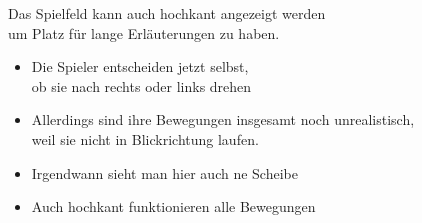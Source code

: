 \documentclass[preview]{standalone}
\begin{document}
\begin{center}
Das Spielfeld kann auch hochkant angezeigt werden\\
        um Platz für lange Erläuterungen zu haben.
        \begin{itemize}
         \item Die Spieler entscheiden jetzt selbst,\\
         ob sie nach rechts oder links drehen
         \item Allerdings sind ihre Bewegungen insgesamt noch unrealistisch,\\
         weil sie nicht in Blickrichtung laufen.
         \item Irgendwann sieht man hier auch ne Scheibe
         \item Auch hochkant funktionieren alle Bewegungen
        \end{itemize}
\end{center}
\end{document}
